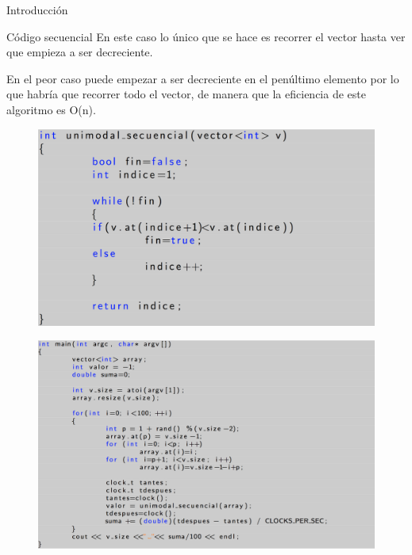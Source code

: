 \documentclass[12pt]{beamer}
\begin{document}
\begin{frame}{Introducción}
\begin{frame}
\end{frame}

\begin{frame}{Código secuencial}
En este caso lo único que se hace es recorrer el vector hasta ver que empieza a ser decreciente.

\vspace{5mm} %

En el peor caso puede empezar a ser decreciente en el penúltimo elemento por lo que habría que recorrer todo el vector, de manera que la eficiencia de este algoritmo es O(n).
\end{frame}

\begin{frame}

\begin{figure}[H] 
\centering
\includegraphics[angle=0,scale=0.35]{img/3.png} 
\label{etiqueta} 
\end{figure}

\end{frame}

\begin{frame}

\begin{figure}[H] 
\centering
\includegraphics[angle=0,scale=0.35]{img/4.png} 
\label{etiqueta} 
\end{figure}


\end{frame}
\end{frame}
\end{document}
